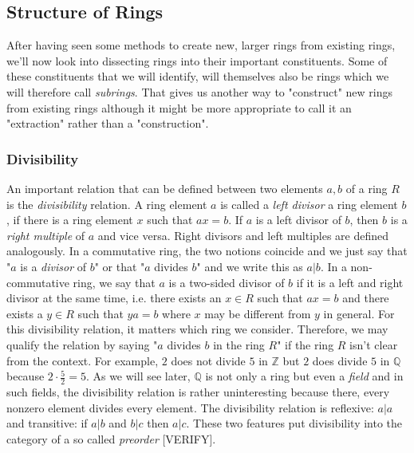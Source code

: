 \subsection{Structure of Rings}
After having seen some methods to create new, larger rings from existing rings, we'll now look into dissecting rings into their important constituents. Some of these constituents that we will identify, will themselves also be rings which we will therefore call \emph{subrings}. That gives us another way to "construct" new rings from existing rings although it might be more appropriate to call it an "extraction" rather than a "construction".


\subsubsection{Divisibility}
An important relation that can be defined between two elements $a,b$ of a ring $R$ is the \emph{divisibility} relation. A ring element $a$ is called a \emph{left divisor} a ring element $b$, if there is a ring element $x$ such that $a x = b$. If $a$ is a left divisor of $b$, then $b$ is a \emph{right multiple} of $a$ and vice versa. Right divisors and left multiples are defined analogously. In a commutative ring, the two notions coincide and we just say that "$a$ is a \emph{divisor} of $b$" or that "$a$ divides $b$" and we write this as $a|b$. In a non-commutative ring, we say that $a$ is a two-sided divisor of $b$ if it is a left and right divisor at the same time, i.e. there exists an $x \in R$ such that $a x = b$ and there exists a $y \in R$ such that $y a = b$ where $x$ may be different from $y$ in general. For this divisibility relation, it matters which ring we consider. Therefore, we may qualify the relation by saying "$a$ divides $b$ in the ring $R$" if the ring $R$ isn't clear from the context. For example, $2$ does not divide $5$ in $\mathbb{Z}$ but $2$ does divide $5$ in $\mathbb{Q}$ because $2 \cdot \frac{5}{2} = 5$. As we will see later, $\mathbb{Q}$ is not only a ring but even a \emph{field} and in such fields, the divisibility relation is rather uninteresting because there, every nonzero element divides every element. The divisibility relation is reflexive: $a|a$ and transitive: if $a|b$ and $b|c$ then $a|c$. These two features put divisibility into the category of a so called \emph{preorder} [VERIFY]. 

